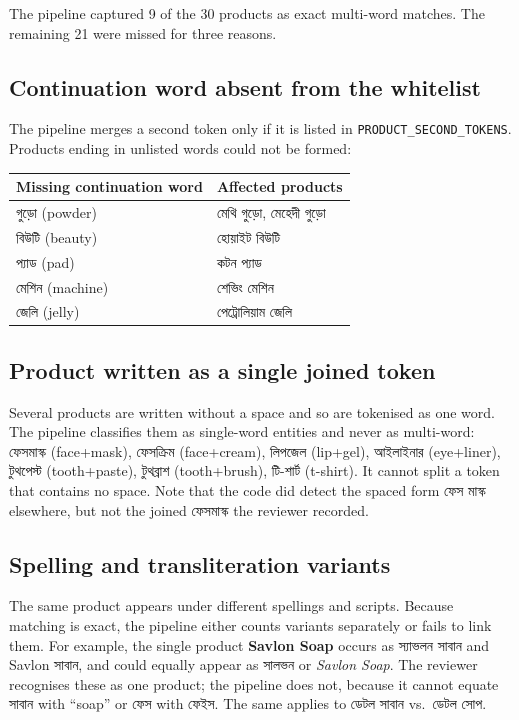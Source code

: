 \documentclass[11pt]{article}
\newcommand{\bn}[1]{{\bnfont #1}}
\begin{document}
The pipeline captured 9 of the 30 products as exact multi-word matches. The
remaining 21 were missed for three reasons.

\subsection{Continuation word absent from the whitelist}
The pipeline merges a second token only if it is listed in
\texttt{PRODUCT\_SECOND\_TOKENS}. Products ending in unlisted words could not be
formed:

\begin{center}
\begin{tabular}{@{}ll@{}}
\toprule
\textbf{Missing continuation word} & \textbf{Affected products} \\
\midrule
\bn{গুড়ো} (powder)  & \bn{মেথি গুড়ো}, \bn{মেহেদী গুড়ো} \\
\bn{বিউটি} (beauty)  & \bn{হোয়াইট বিউটি} \\
\bn{প্যাড} (pad)     & \bn{কটন প্যাড} \\
\bn{মেশিন} (machine) & \bn{শেভিং মেশিন} \\
\bn{জেলি} (jelly)    & \bn{পেট্রোলিয়াম জেলি} \\
\bottomrule
\end{tabular}
\end{center}

\subsection{Product written as a single joined token}
Several products are written without a space and so are tokenised as one word.
The pipeline classifies them as single-word entities and never as multi-word:
\bn{ফেসমাস্ক} (face+mask), \bn{ফেসক্রিম} (face+cream), \bn{লিপজেল} (lip+gel),
\bn{আইলাইনার} (eye+liner), \bn{টুথপেস্ট} (tooth+paste), \bn{টুথব্রাশ}
(tooth+brush), \bn{টি-শার্ট} (t-shirt). It cannot split a token that contains no
space. Note that the code did detect the spaced form \bn{ফেস মাস্ক} elsewhere,
but not the joined \bn{ফেসমাস্ক} the reviewer recorded.

\subsection{Spelling and transliteration variants}
The same product appears under different spellings and scripts. Because matching
is exact, the pipeline either counts variants separately or fails to link them.
For example, the single product \textbf{Savlon Soap} occurs as
\bn{স্যাভলন সাবান} and \bn{Savlon সাবান}, and could equally appear as \bn{সালভন}
or \emph{Savlon Soap}. The reviewer recognises these as one product; the pipeline
does not, because it cannot equate \bn{সাবান} with ``soap'' or \bn{ফেস} with
\bn{ফেইস}. The same applies to \bn{ডেটল সাবান} vs.\ \bn{ডেটল সোপ}.
\end{document}
